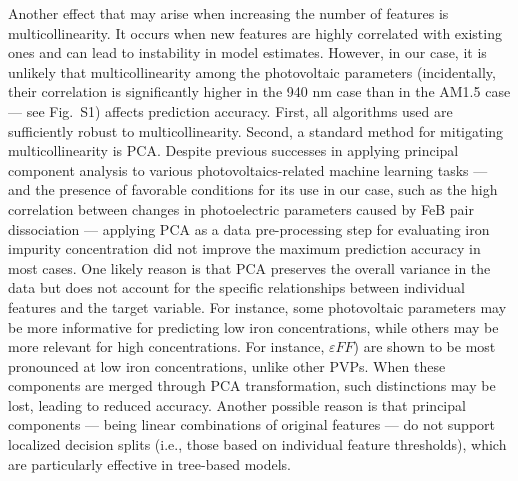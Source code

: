 \documentclass[a4paper,fleqn]{cas-sc}
\begin{document}
Another effect that may arise when increasing the number of features is multicollinearity.
It occurs when new features are highly correlated with existing ones and can lead to instability in model estimates.
However, in our case, it is unlikely that multicollinearity among the photovoltaic parameters
(incidentally, their correlation is significantly higher in the 940 nm case than in the AM1.5 case — see Fig.~S1)
affects prediction accuracy.
First, all algorithms used are sufficiently robust to multicollinearity.
Second, a standard method for mitigating multicollinearity is PCA.
Despite previous successes in applying principal component analysis to various
photovoltaics-related machine learning tasks \cite{Gao2020,Fadhel2019,David2021,Liu2022,AbdullahVetter2025} ---
and the presence of favorable conditions for its use in our case,
such as the high correlation between changes in photoelectric parameters caused by FeB pair dissociation ---
applying PCA as a data pre-processing step for evaluating iron impurity concentration did not improve the maximum prediction accuracy in most cases.
One likely reason is that PCA preserves the overall variance in the data
but does not account for the specific relationships between individual features and the target variable.
For instance, some photovoltaic parameters may be more informative for predicting low iron concentrations,
while others may be more relevant for high concentrations.
For instance, $\varepsilon F\!F$) are shown \cite{Olikh2025MSEB} to be most pronounced at low iron concentrations, unlike other PVPs.
When these components are merged through PCA transformation, such distinctions may be lost, leading to reduced accuracy.
Another possible reason is that principal components ---
being linear combinations of original features --- do not support localized decision splits
(i.e., those based on individual feature thresholds), which are particularly effective in tree-based models.
\end{document}
